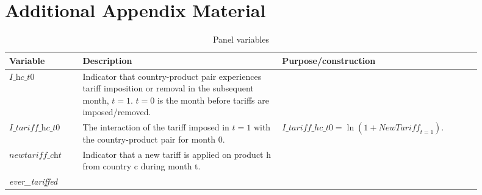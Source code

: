 \section{Additional Appendix Material}

\begin{table}[H]
\centering
\caption{Panel variables}\label{tab:panel_variables}
\begin{tabular}{p{0.14\linewidth} p{0.38\linewidth} p{0.38\linewidth}}
\hline\hline
\textbf{Variable} & \textbf{Description} & \textbf{Purpose/construction}\\
\hline\hline


                $\textit{I\_hc\_t0}$ & Indicator that country-product pair experiences tariff imposition or removal in the subsequent month, $t=1$. $t=0$ is the month before tariffs are imposed/removed. & \\[1ex]

                $\textit{I\_tariff\_hc\_t0}$ & The interaction of the tariff imposed in $t=1$ with the country-product pair for month $0$. & $\mathit{I\_tariff\_hc\_t0}=\ln(1+\textit{NewTariff}_{t=1})$. \\[1ex]

                $\textit{newtariff\_cht}$ & Indicator that a new tariff is applied on product h from country c during month t. & \\[1ex]

                \textit{ever\_tariffed} & & \\[1ex]
            
            
\end{tabular}
\end{table}